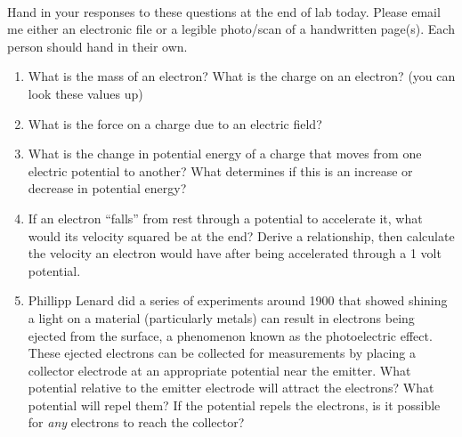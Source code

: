 \documentclass{tufte-handout}
\begin{document}



\vspace{0.5cm}
\\
\vspace{0.5cm}

Hand in your responses to these questions at the end of lab today.  Please email me either an electronic file or a legible photo/scan of a handwritten page(s).  Each person should hand in their own.

\begin{enumerate}

\item What is the mass of an electron? What is the charge on an electron? (you can look these values up)

\item What is the force on a charge due to an electric field?

\item What is the change in potential energy of a charge that moves from one electric potential to another?  What determines if this is an increase or decrease in potential energy?

\item \label{q-velocity} If an electron ``falls'' from rest through a potential to accelerate it, what would its velocity squared be at the end? Derive a relationship, then calculate the velocity an electron would have after
being accelerated through a 1 volt potential.


\item \label{q-photocell} Phillipp Lenard did a series of experiments around 1900 that showed shining a light on a material (particularly metals) can result in electrons being ejected from the surface, a phenomenon known as the photoelectric effect.  These ejected electrons can be collected for measurements by placing a collector electrode at an appropriate potential near the emitter.  What potential relative to the emitter electrode will attract the electrons?  What potential will repel them?  If the potential repels the electrons, is it possible for {\em any} electrons to reach the collector?


\end{enumerate}
\end{document}
